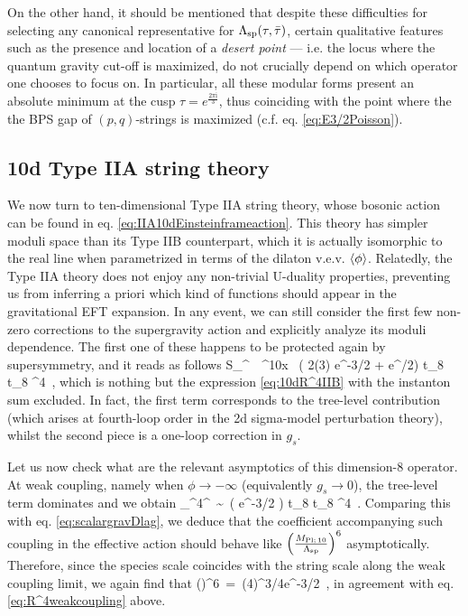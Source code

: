 On the other hand, it should be mentioned that despite these difficulties for selecting any canonical representative for $\Lambda_{\text{sp}} (\tau, \bar \tau)$, certain qualitative features such as the presence and location of a \emph{desert point} \cite{Long:2021jlv, vandeHeisteeg:2022btw} --- i.e. the locus where the quantum gravity cut-off is maximized, do not crucially depend on which operator one chooses to focus on. In particular, all these modular forms present an absolute minimum at the cusp $\tau= e^{\frac{2\pi \text{i}}{3}}$, thus coinciding with the point where the the BPS gap of $(p,q)$-strings is maximized (c.f. eq. \eqref{eq:E3/2Poisson}).


\subsection{ 10d Type IIA string theory}
\label{ss:10dIIA}

We now turn to ten-dimensional Type IIA string theory, whose bosonic action can be found in eq. \eqref{eq:IIA10dEinsteinframeaction}. This theory has simpler moduli space than its Type IIB counterpart, which it is actually isomorphic to the real line when parametrized in terms of the dilaton v.e.v. $\braket{\phi}$. Relatedly, the Type IIA theory does not enjoy any non-trivial U-duality properties, preventing us from inferring a priori which kind of functions should appear in the gravitational EFT expansion. In any event, we can still consider the first few non-zero corrections to the supergravity action and explicitly analyze its moduli dependence. The first one of these happens to be protected again by supersymmetry, and it reads as follows \cite{Grisaru:1986dk,Grisaru:1986kw,Gross:1986iv} 
%
\beq
S_^{}\, \supset\,  \int \dd^{10}x \, \left( 2\zeta(3) e^{-3\phi/2} +  e^{\phi/2}\right) t_8 t_8 ^4\, ,
\label{eq:10dR^4IIA}
\eeq
%
which is nothing but the expression \eqref{eq:10dR^4IIB} with the instanton sum excluded. In fact, the first term corresponds to the tree-level contribution (which arises at fourth-loop order in the 2d sigma-model perturbation theory), whilst the second piece is a one-loop correction in $g_s$. 

Let us now check what are the relevant asymptotics of this dimension-8 operator. At weak coupling, namely when $\phi \to -\infty$ (equivalently $g_s \to 0$), the tree-level term dominates and we obtain
%
\beq
{}_{^4}^{}\, \sim\,  \left( e^{-3\phi/2} \right) t_8 t_8 ^4\ .
\label{eq:R^4weakcoupling}
\eeq
%
Comparing this with eq. \eqref{eq:scalargravDlag}, we deduce that the coefficient accompanying such coupling in the effective action should behave like $\left(\frac{M_{\text{Pl;}\, 10}}{\Lambda_{\text{sp}}}\right)^{6}$ asymptotically. Therefore, since the species scale coincides with the string scale along the weak coupling limit, we again find that
%
\beq
\left(\frac{\Mpt}{\LSP}\right)^{6}\, =\, (4\pi)^{3/4}e^{-3\phi/2}\, ,
\eeq
%
in agreement with eq. \eqref{eq:R^4weakcoupling} above.

